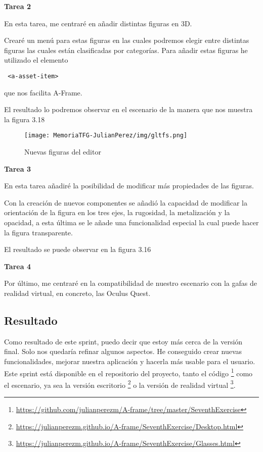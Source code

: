 \documentclass[a4paper, 12pt]{book}
\begin{document}
\textbf{Tarea 2}

En esta tarea, me centraré en añadir distintas figuras en 3D.

Crearé un menú para estas figuras en las cuales podremos elegir entre distintas figuras las cuales están clasificadas por categorías. Para añadir estas figuras he utilizado el elemento \begin{verbatim} <a-asset-item>\end{verbatim} que nos facilita A-Frame.

El resultado lo podremos observar en el escenario de la manera que nos muestra la figura 3.18

\begin{figure}[H]
  \centering
  \texttt{[image: MemoriaTFG-JulianPerez/img/gltfs.png]}
  \caption{Nuevas figuras del editor}\label{fig}
\end{figure}

\textbf{Tarea 3}

En esta tarea añadiré la posibilidad de modificar más propiedades de las figuras.

Con la creación de nuevos componentes se añadió la capacidad de modificar la orientación de la figura en los tres ejes, la rugosidad, la metalización y  la opacidad, a esta última se le añade una funcionalidad especial la cual puede hacer la figura transparente.

El resultado se puede observar en la figura 3.16

\textbf{Tarea 4}

Por último, me centraré en la compatibilidad de nuestro escenario con la gafas de realidad virtual, en concreto, las Oculus Quest. 

\subsection{Resultado}

Como resultado de este sprint, puedo decir que estoy más cerca de la versión final. Solo nos quedaría refinar algunos aspectos. He conseguido crear nuevas funcionalidades, mejorar nuestra aplicación y hacerla más usable para el usuario. Este sprint está disponible en el repositorio del proyecto, tanto el código \footnote{\url{https://github.com/julianperezm/A-frame/tree/master/SeventhExercise}} como el escenario, ya sea la versión escritorio \footnote{\url{https://julianperezm.github.io/A-frame/SeventhExercise/Desktop.html}} o la versión de realidad virtual \footnote{\url{https://julianperezm.github.io/A-frame/SeventhExercise/Glasses.html}}.
\end{document}
